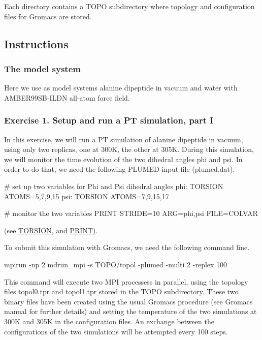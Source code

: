 Each directory contains a T\+O\+P\+O subdirectory where topology and configuration files for Gromacs are stored.\hypertarget{belfast-7_belfast-7-instructions}{}\subsection{Instructions}\label{belfast-7_belfast-7-instructions}
\hypertarget{belfast-7_belfast-7-system}{}\subsubsection{The model system}\label{belfast-7_belfast-7-system}
Here we use as model systems alanine dipeptide in vacuum and water with A\+M\+B\+E\+R99\+S\+B-\/\+I\+L\+D\+N all-\/atom force field.\hypertarget{belfast-7_belfast-7-exercise-1}{}\subsubsection{Exercise 1. Setup and run a P\+T simulation, part I}\label{belfast-7_belfast-7-exercise-1}
In this exercise, we will run a P\+T simulation of alanine dipeptide in vacuum, using only two replicas, one at 300\+K, the other at 305\+K. During this simulation, we will monitor the time evolution of the two dihedral angles phi and psi. In order to do that, we need the following P\+L\+U\+M\+E\+D input file (plumed.\+dat).

\begin{DoxyVerb}# set up two variables for Phi and Psi dihedral angles 
phi: TORSION ATOMS=5,7,9,15
psi: TORSION ATOMS=7,9,15,17

# monitor the two variables
PRINT STRIDE=10 ARG=phi,psi FILE=COLVAR\end{DoxyVerb}
 (see \hyperlink{TORSION}{T\+O\+R\+S\+I\+O\+N}, and \hyperlink{PRINT}{P\+R\+I\+N\+T}).

To submit this simulation with Gromacs, we need the following command line.

\begin{DoxyVerb}mpirun -np 2 mdrun_mpi -s TOPO/topol -plumed -multi 2 -replex 100
\end{DoxyVerb}


This command will execute two M\+P\+I processess in parallel, using the topology files topol0.\+tpr and topol1.\+tpr stored in the T\+O\+P\+O subdirectory. These two binary files have been created using the usual Gromacs procedure (see Gromacs manual for further details) and setting the temperature of the two simulations at 300\+K and 305\+K in the configuration files. An exchange between the configurations of the two simulations will be attempted every 100 steps.

